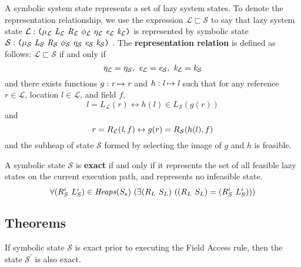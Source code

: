 \begin{definition}
A symbolic system state represents a set of lazy system states. To denote the representation relationship, we use the expression $\mathcal{L}\sqsubset \mathcal{S} $ to say that lazy system state $\mathcal{L}:\lp \mu_{\mathcal{L}}\ \cfgnt{L}_{\mathcal{L}}\ \cfgnt{R}_{\mathcal{L}}\ \phi_{\mathcal{L}}\ \eta_{\mathcal{L}}\ \cfgnt{e}_{\mathcal{L}}\ \cfgnt{k}_{\mathcal{L}}\rp$ is represented by symbolic state $\mathcal{S}:\lp \mu_{\mathcal{S}}\ \cfgnt{L}_{\mathcal{S}}\ \cfgnt{R}_{\mathcal{S}}\ \phi_{\mathcal{S}}\ \eta_{\mathcal{S}}\ \cfgnt{e}_{\mathcal{S}}\ \cfgnt{k}_{\mathcal{S}}\rp$ . The \textbf{representation relation} is defined as follows: $\mathcal{L}\sqsubset \mathcal{S} $ if and only if 
$$\eta_{\mathcal{L}} = \eta_{\mathcal{S}} ,\ \emph{e}_{\mathcal{L}} = \emph{e}_{\mathcal{S}} ,\ \emph{k}_{\mathcal{L}} = \emph{k}_{\mathcal{S}}$$
and there exists functions $g:\emph{r} \mapsto \emph{r}$ and $h:\emph{l} \mapsto \emph{l}$ such that for any reference $r \in \mathcal{L}$, location $l \in \mathcal{L}$, and field $f$, $$ l = L_{\mathcal{L}}(r) \leftrightarrow h(l)\in L_{\mathcal{S}}(g(r))$$ and $$ r = R_{\mathcal{L}}(\emph{l},f) \leftrightarrow g(r) = R_{\mathcal{S}}(h(l),f)$$ and the subheap of state $\mathcal{S}$ formed by selecting the image of $g$ and $h$ is feasible.

\end{definition}

\begin{definition}
A symbolic state $\mathcal{S}$ is \textbf{exact} if and only if it represents the set of all feasible lazy states on the current execution path, and represents no infeasible state.
\[
 \forall (R_S^i\ L_S^i) \in \mathit{Heaps}(S_s)\ (\exists (R_L\ S_L)\ ((R_L\ S_L) = (R_S^i\ L_S^i))) \\ \\
\]

\end{definition}

\subsection{Theorems}

\begin{lemma}
If symbolic state $\mathcal{S}$ is exact prior to executing the Field Access rule, then the state $\mathcal{S}^\prime $ is also exact.
\end{lemma}


